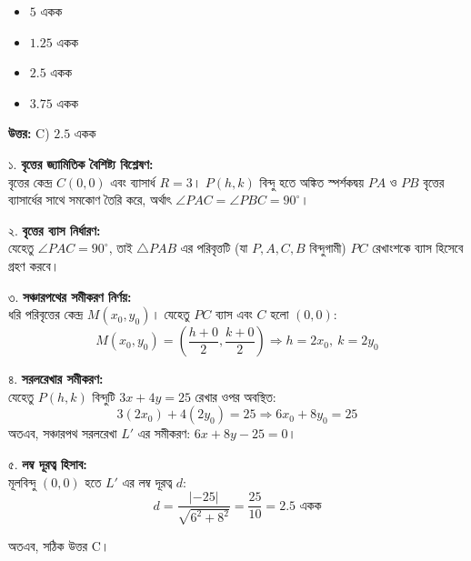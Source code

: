 \documentclass[12pt, a4paper]{article}
\begin{document}
\begin{itemize}[label={}, leftmargin=1cm, itemsep=0.5em]
    \item[\textbf{A)}] $5$ একক
    \item[\textbf{B)}] $1.25$ একক
    \item[\textbf{C)}] $2.5$ একক
    \item[\textbf{D)}] $3.75$ একক
\end{itemize}

\vspace{0.5em}
\begin{tcolorbox}[answerbox]
    \textbf{\color{success} উত্তর:} C) $2.5$ একক
\end{tcolorbox}
\vspace{1em}

\begin{tcolorbox}[solutionbox={সমাধান (Solution)}]
    \noindent
    ১. \textbf{বৃত্তের জ্যামিতিক বৈশিষ্ট্য বিশ্লেষণ:} \\
    বৃত্তের কেন্দ্র $C(0, 0)$ এবং ব্যাসার্ধ $R = 3$। $P(h, k)$ বিন্দু হতে অঙ্কিত স্পর্শকদ্বয় $PA$ ও $PB$ বৃত্তের ব্যাসার্ধের সাথে সমকোণ তৈরি করে, অর্থাৎ $\angle PAC = \angle PBC = 90^{\circ}$।
    
    \vspace{0.5em}
    ২. \textbf{বৃত্তের ব্যাস নির্ধারণ:} \\
    যেহেতু $\angle PAC = 90^{\circ}$, তাই $\triangle PAB$ এর পরিবৃত্তটি (যা $P, A, C, B$ বিন্দুগামী) $PC$ রেখাংশকে ব্যাস হিসেবে গ্রহণ করবে।
    
    \vspace{0.5em}
    ৩. \textbf{সঞ্চারপথের সমীকরণ নির্ণয়:} \\
    ধরি পরিবৃত্তের কেন্দ্র $M(x_0, y_0)$। যেহেতু $PC$ ব্যাস এবং $C$ হলো $(0, 0)$:
    \[ M(x_0, y_0) = \left(\frac{h + 0}{2}, \frac{k + 0}{2}\right) \Rightarrow h = 2x_0, \ k = 2y_0 \]
    
    \vspace{0.5em}
    ৪. \textbf{সরলরেখার সমীকরণ:} \\
    যেহেতু $P(h, k)$ বিন্দুটি $3x + 4y = 25$ রেখার ওপর অবস্থিত:
    \[ 3(2x_0) + 4(2y_0) = 25 \Rightarrow 6x_0 + 8y_0 = 25 \]
    অতএব, সঞ্চারপথ সরলরেখা $L'$ এর সমীকরণ: $6x + 8y - 25 = 0$।
    
    \vspace{0.5em}
    ৫. \textbf{লম্ব দূরত্ব হিসাব:} \\
    মূলবিন্দু $(0, 0)$ হতে $L'$ এর লম্ব দূরত্ব $d$:
    \[ d = \frac{|-25|}{\sqrt{6^2 + 8^2}} = \frac{25}{10} = 2.5 \text{ একক} \]
    
    \vspace{0.5em}
    অতএব, সঠিক উত্তর C।
\end{tcolorbox}
\end{document}
